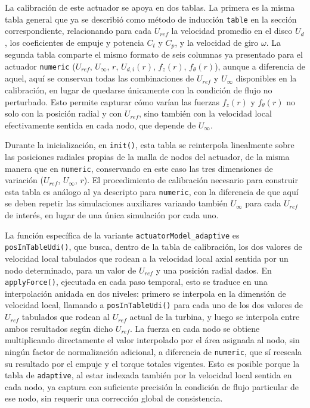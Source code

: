 La calibración de este actuador se apoya en dos tablas. La primera es la misma tabla general que ya se describió como método de inducción \texttt{table} en la sección correspondiente, relacionando para cada $U_{ref}$ la velocidad promedio en el disco $U_d$, los coeficientes de empuje y potencia $C_t$ y $C_p$, y la velocidad de giro $\omega$. La segunda tabla comparte el mismo formato de seis columnas ya presentado para el actuador \texttt{numeric} ($U_{ref}$, $U_\infty$, $r$, $U_{d,i}(r)$, $f_z(r)$, $f_\theta(r)$), aunque a diferencia de aquel, aquí se conservan todas las combinaciones de $U_{ref}$ y $U_\infty$ disponibles en la calibración, en lugar de quedarse únicamente con la condición de flujo no perturbado. Esto permite capturar cómo varían las fuerzas $f_z(r)$ y $f_\theta(r)$ no solo con la posición radial y con $U_{ref}$, sino también con la velocidad local efectivamente sentida en cada nodo, que depende de $U_\infty$.

Durante la inicialización, en \texttt{init()}, esta tabla se reinterpola linealmente sobre las posiciones radiales propias de la malla de nodos del actuador, de la misma manera que en \texttt{numeric}, conservando en este caso las tres dimensiones de variación (${U_{ref}}$, ${U_\infty}$, $r$). El procedimiento de calibración necesario para construir esta tabla es análogo al ya descripto para \texttt{numeric}, con la diferencia de que aquí se deben repetir las simulaciones auxiliares variando también $U_\infty$ para cada $U_{ref}$ de interés, en lugar de una única simulación por cada uno.

La función específica de la variante \texttt{actuatorModel\_adaptive} es \texttt{posInTableUdi()}, que busca, dentro de la tabla de calibración, los dos valores de velocidad local tabulados que rodean a la velocidad local axial sentida por un nodo determinado, para un valor de $U_{ref}$ y una posición radial dados. En \texttt{applyForce()}, ejecutada en cada paso temporal, esto se traduce en una interpolación anidada en dos niveles: primero se interpola en la dimensión de velocidad local, llamando a \texttt{posInTableUdi()} para cada uno de los dos valores de $U_{ref}$ tabulados que rodean al $U_{ref}$ actual de la turbina, y luego se interpola entre ambos resultados según dicho $U_{ref}$. La fuerza en cada nodo se obtiene multiplicando directamente el valor interpolado por el área asignada al nodo, sin ningún factor de normalización adicional, a diferencia de \texttt{numeric}, que sí reescala su resultado por el empuje y el torque totales vigentes. Esto es posible porque la tabla de \texttt{adaptive}, al estar indexada también por la velocidad local sentida en cada nodo, ya captura con suficiente precisión la condición de flujo particular de ese nodo, sin requerir una corrección global de consistencia.

